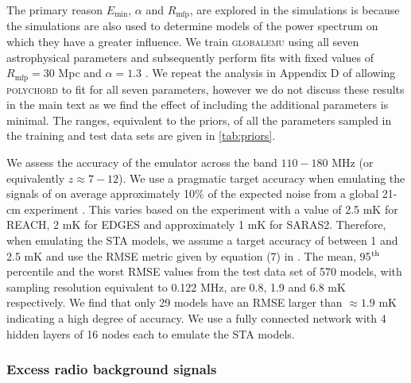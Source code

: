The primary reason $E_\mathrm{min}$, $\alpha$ and $R_\mathrm{mfp}$, are explored in the simulations is because the simulations are also used to determine models of the power spectrum on which they have a greater influence. We train \textsc{globalemu} using all seven astrophysical parameters and subsequently perform fits with fixed values of $R_\mathrm{mfp} = 30$ Mpc and $\alpha = 1.3$ \citep[as was done with the EDGES High Band data in ][ using the contemporary standard astrophysical models and signal emulator]{Monsalve_EDGES_HB_3_2019}. We repeat the analysis in Appendix D of \cite{Bevins_SARAS2_2022} allowing \textsc{polychord} to fit for all seven parameters, however we do not discuss these results in the main text as we find the effect of including the additional parameters is minimal. The ranges, equivalent to the priors, of all the parameters sampled in the training and test data sets are given in \cref{tab:priors}.

We assess the accuracy of the emulator across the band $110 - 180$ MHz (or equivalently $z \approx 7 - 12$). We use a pragmatic target accuracy when emulating the signals of on average approximately 10\% of the expected noise from a global 21-cm experiment \citep{Bevins_globalemu_2021}. This varies based on the experiment with a value of 2.5 mK for REACH, 2 mK for EDGES \citep{Bowman_edges_2018} and approximately 1 mK for SARAS2. Therefore, when emulating the STA models, we assume a target accuracy of between 1 and 2.5 mK and use the RMSE metric given by equation (7) in \cite{Bevins_globalemu_2021}. The mean, 95$\textsuperscript{th}$ percentile and the worst RMSE values from the test data set of 570 models, with sampling resolution equivalent to 0.122 MHz, are 0.8, 1.9 and 6.8 mK respectively. We find that only 29 models have an RMSE larger than $\approx 1.9$ mK indicating a high degree of accuracy. We use a fully connected network with 4 hidden layers of 16 nodes each to emulate the STA models.


\subsubsection{Excess radio background signals}


